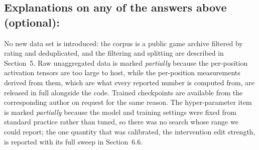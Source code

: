 \documentclass[manuscript, screen, review]{jair}
\theoremstyle{remark}
\begin{document}
\subsection*{Explanations on any of the answers above (optional):}

No new data set is introduced: the corpus is a public game archive filtered by
rating and deduplicated, and the filtering and splitting are described in
Section~5. Raw unaggregated data is marked \emph{partially} because the
per-position activation tensors are too large to host, while the per-position
measurements derived from them, which are what every reported number is computed
from, are released in full alongside the code. Trained checkpoints are available
from the corresponding author on request for the same reason. The
hyper-parameter item is marked \emph{partially} because the model and training
settings were fixed from standard practice rather than tuned, so there was no
search whose range we could report; the one quantity that was calibrated, the
intervention edit strength, is reported with its full sweep in Section~6.6.
\end{document}
